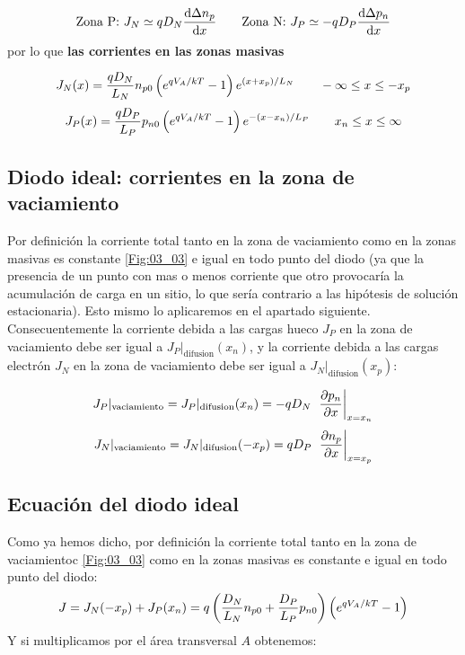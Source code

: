 \begin{equation} 
    \text{Zona P:} \ J_N \simeq qD_N \frac{\mathrm{d} \Delta n_p}{\mathrm{d} x} \qquad \text{Zona N:} \ J_P \simeq -qD_P \frac{\mathrm{d} \Delta p_n}{\mathrm{d} x}
\end{equation}
por lo que \textbf{las corrientes en las zonas masivas}

\begin{equation}
    J_N (x) = \frac{qD_N}{L_N} n_{p0} \left( e^{qV_A/kT}-1 \right) e^{(x+x_p)/L_N} \qquad -\infty \leq x \leq -x_p \end{equation} \begin{equation} J_P (x) = \frac{qD_P}{L_P} p_{n0} \left( e^{qV_A/kT}-1 \right) e^{-(x-x_n)/L_P} \qquad x_n \leq x \leq \infty
\end{equation}

\subsection{Diodo ideal: corrientes en la zona de vaciamiento}

Por definición la corriente total tanto en la zona de vaciamiento como en la zonas masivas es constante \cref{Fig:03_03} e igual en todo punto del diodo (ya que la presencia de un punto con mas o menos corriente que otro provocaría la acumulación de carga en un sitio, lo que sería contrario a las hipótesis de solución estacionaria). Esto mismo lo aplicaremos en el apartado siguiente. Consecuentemente la corriente debida a las cargas hueco $J_P$ en la zona de vaciamiento debe ser igual a $J_P|_{\text{difusion}} (x_n)$, y la corriente debida a las cargas electrón $J_N$ en la zona de vaciamiento debe ser igual a $J_N|_{\text{difusion}} (x_p)$:

\begin{equation}
    J_P |_{\text{vaciamiento}} = J_P|_{\text{difusion}} (x_n) = - q D_N  \ \eval{\parciales{p_n}{x}}_{x=x_n} \end{equation}
\begin{equation}     
    J_N |_{\text{vaciamiento}} = J_N|_{\text{difusion}} (-x_p) =  q D_P  \ \eval{\parciales{n_p}{x}}_{x=x_p}
\end{equation}

\subsection{Ecuación del diodo ideal}

Como ya hemos dicho, por definición la corriente total tanto en la zona de vaciamientoc \cref{Fig:03_03} como en la zonas masivas es constante e igual en todo punto del  diodo:
\begin{equation}
    J =  J_N (-x_p) + J_P (x_n) = q \left( \frac{D_N}{L_N} n_{p0} + \frac{D_P}{L_P} p_{n0} \right) \left( e^{qV_A/kT}-1 \right)
\end{equation}
Y si multiplicamos por el área transversal $A$ obtenemos:

